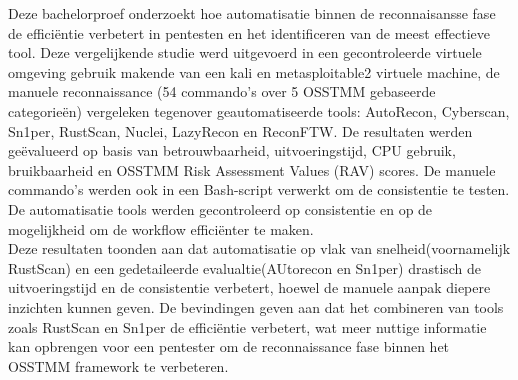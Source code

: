 Deze bachelorproef onderzoekt hoe automatisatie binnen de reconnaisansse fase de efficiëntie verbetert in pentesten en het identificeren van de meest effectieve tool.
Deze vergelijkende studie werd uitgevoerd in een gecontroleerde virtuele omgeving gebruik makende van een kali en metasploitable2 virtuele machine, de manuele reconnaissance (54 commando's over 5 OSSTMM gebaseerde categorieën) vergeleken tegenover geautomatiseerde tools: AutoRecon, Cyberscan, Sn1per, RustScan, Nuclei, LazyRecon en ReconFTW.
De resultaten werden geëvalueerd op basis van betrouwbaarheid, uitvoeringstijd, CPU gebruik, bruikbaarheid en OSSTMM Risk Assessment Values (RAV) scores.
De manuele commando's werden ook in een Bash-script verwerkt om de consistentie te testen. De automatisatie tools werden gecontroleerd op consistentie en op de mogelijkheid om de workflow efficiënter te maken.\\


Deze resultaten toonden aan dat automatisatie op vlak van snelheid(voornamelijk RustScan) en een gedetaileerde evalualtie(AUtorecon en Sn1per)
drastisch de uitvoeringstijd en de consistentie verbetert, hoewel de manuele aanpak diepere inzichten kunnen geven.
De bevindingen geven aan dat het combineren van tools zoals RustScan en Sn1per de efficiëntie verbetert, wat meer nuttige informatie kan opbrengen voor een pentester om de reconnaissance fase binnen het OSSTMM framework te verbeteren.
